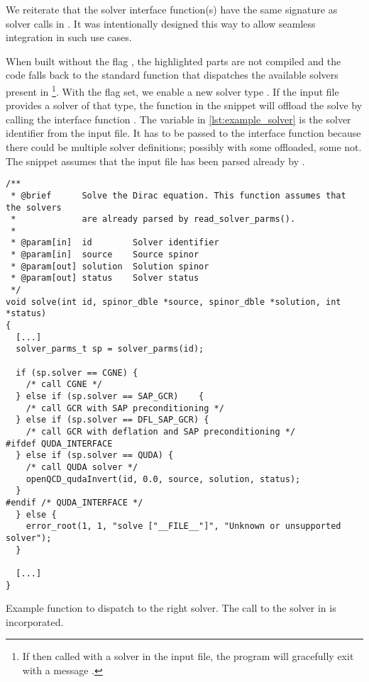 We reiterate that the solver interface function(s) have the same signature as solver calls in \openqxd.
It was intentionally designed this way to allow seamless integration in such use cases.

When built without the flag , the highlighted parts are not compiled and the code falls back to the standard function that dispatches the available solvers present in \openqxd
\footnote{If then called with a \quda solver in the input file, the program will gracefully exit with a message .}.
With the flag set, we enable a new solver type .
If the input file provides a solver of that type, the function in the snippet will offload the solve by calling the interface function .
The variable  in \cref{lst:example_solver} is the solver identifier from the input file.
It has to be passed to the interface function because there could be multiple solver definitions; possibly with some offloaded, some not.
The snippet assumes that the input file has been parsed already by .
\begin{codelisting}
\begin{verbatim}
/**
 * @brief      Solve the Dirac equation. This function assumes that the solvers
 *             are already parsed by read_solver_parms().
 *
 * @param[in]  id        Solver identifier
 * @param[in]  source    Source spinor
 * @param[out] solution  Solution spinor
 * @param[out] status    Solver status
 */
void solve(int id, spinor_dble *source, spinor_dble *solution, int *status)
{
  [...]
  solver_parms_t sp = solver_parms(id);

  if (sp.solver == CGNE) {
    /* call CGNE */
  } else if (sp.solver == SAP_GCR)    {
    /* call GCR with SAP preconditioning */
  } else if (sp.solver == DFL_SAP_GCR) {
    /* call GCR with deflation and SAP preconditioning */
#ifdef QUDA_INTERFACE
  } else if (sp.solver == QUDA) {
    /* call QUDA solver */
    openQCD_qudaInvert(id, 0.0, source, solution, status);
  }
#endif /* QUDA_INTERFACE */
  } else {
    error_root(1, 1, "solve ["__FILE__"]", "Unknown or unsupported solver");
  }

  [...]
}
\end{verbatim}
\caption{Example function to dispatch to the right solver. The call to the solver in \quda is incorporated.}
\label{lst:example_solver}
\end{codelisting}


